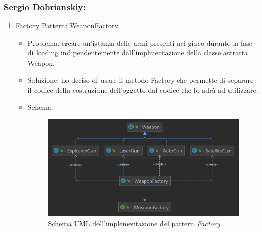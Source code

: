 \documentclass[a4paper,12pt]{report}
\begin{document}
\subsubsection*{Sergio Dobrianskiy:}
%
\begin{enumerate}

	
	\item Factory Pattern: WeaponFactory
			
	\begin{itemize}
		\item Problema: creare un'istanza delle armi presenti nel gioco durante la fase di loading indipendentemente dall'implmentazione della classe astratta Weapon.
		\item Soluzione: ho deciso di usare il metodo Factory che permette di separare il codice della costruzione dell'oggetto dal codice che lo adrà ad utilizzare.
		\item Schema:
		\begin{figure}[H]
			\centering{}
			\includegraphics[width=\textwidth]{img/factory.png}
			\caption{Schema UML dell'implementazione del pattern \emph{Factory}}
			\label{img:Factory Pattern}
		\end{figure}
	\end{itemize}
	

\end{enumerate}
\end{document}
